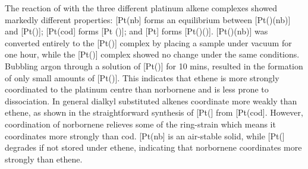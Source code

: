 
The reaction of \tButhixantphos{} with the three different platinum alkene complexes showed markedly different properties:  [Pt(nb] forms an equilibrium between [Pt(\tButhixantphos)(nb)] and [Pt(\tButhixantphos)];  [Pt(cod] forms [Pt (\tButhixantphos)]; and [Pt] forms [Pt(\tButhixantphos)()]. [Pt(\tButhixantphos)(nb)] was converted entirely to the [Pt(\tButhixantphos)] complex by placing a sample under vacuum for one hour, while the [Pt(\tButhixantphos)] complex showed no change under the same conditions.  Bubbling argon through a solution of [Pt(\tButhixantphos)] for 10 mins, resulted in the formation of only small amounts of [Pt(\tButhixantphos)].  This indicates that ethene is more strongly coordinated to the platinum centre than norbornene and is less prone to dissociation.  In general dialkyl substituted alkenes coordinate more weakly than ethene, as shown in the straightforward synthesis of [Pt(] from [Pt(cod].\cite{Green1975b, Tolman1974b}  However, coordination of norbornene relieves some of the ring-strain which means it coordinates more strongly than cod.  [Pt(nb] is an air-stable solid, while [Pt(] degrades if not stored under ethene, indicating that norbornene coordinates more strongly than ethene.


